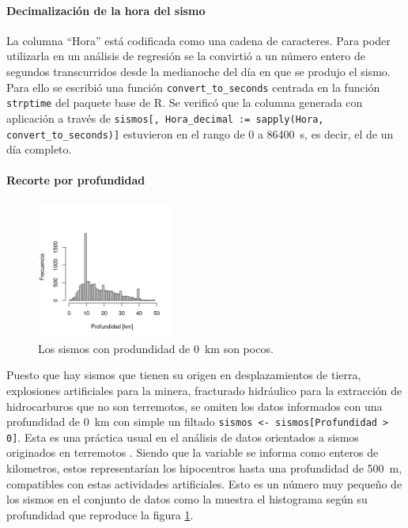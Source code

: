 \documentclass[a4paper]{report}
\begin{document}
\paragraph{Decimalización de la hora del sismo}
La columna ``Hora'' está codificada como una cadena de caracteres.
Para poder utilizarla en un análisis de regresión se la convirtió a un número entero de segundos transcurridos desde la medianoche del día en que se produjo el sismo. 
Para ello se escribió una función \verb'convert_to_seconds' centrada en la función \verb'strptime' del paquete base de R.
Se verificó que la columna generada con aplicación a través de \verb'sismos[, Hora_decimal := sapply(Hora, convert_to_seconds)]' estuvieron en el rango de \num{0} a \SI{86400}{\second}, es decir, el de un día completo.


\paragraph{Recorte por profundidad}

\begin{figure}
	\includegraphics[width=0.4\textwidth]{histograma_profundidad_menos50.png}
	\caption{Los sismos con produndidad de \SI{0}{km} son pocos.}
	\label{fig:histograma_profundidad}
\end{figure}

Puesto que hay sismos que tienen su origen en desplazamientos de tierra, explosiones artificiales para la minera, fracturado hidráulico para la extracción de hidrocarburos que no son terremotos, se omiten los datos informados con una profundidad de \SI{0}{\kilo\metre} con simple un filtado \verb'sismos <- sismos[Profundidad > 0]'.
Esta es una práctica usual en el análisis de datos orientados a sismos originados en terremotos \cite{hu_applying_2024}.
Siendo que la variable se informa como enteros de kilometros, estos representarían los hipocentros hasta una profundidad de \SI{500}{\metre}, compatibles con estas actividades artificiales.
Esto es un número muy pequeño de los sismos en el conjunto de datos como la muestra el histograma según su profundidad que reproduce la figura \ref{fig:histograma_profundidad}.
\end{document}
